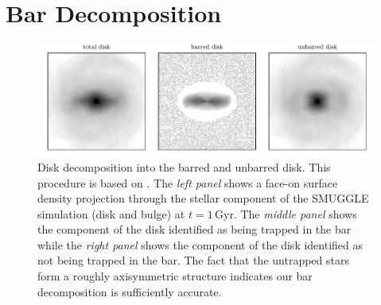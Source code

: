 \documentclass[fleqn,usenatbib]{mnras}
\newcommand{\SMUGGLE}{SMUGGLE}
\begin{document}
\section{Bar Decomposition}
\label{app:bardecomp}
\begin{figure}
    \centering
    \includegraphics[width=18cm]{fig/bar_decomp.pdf}
    \caption{Disk decomposition into the barred and unbarred disk. This
    procedure is based on \citet{2016MNRAS.463.1952P}. The \textit{left panel}
    shows a face-on surface density projection through the stellar component of
    the \SMUGGLE{} simulation (disk and bulge) at $t=1\,\textrm{Gyr}$. The
    \textit{middle panel} shows the component of the disk identified as being
    trapped in the bar while the \textit{right panel} shows the component of the
    disk identified as not being trapped in the bar. The fact that the untrapped
    stars form a roughly axisymmetric structure indicates our bar decomposition
    is sufficiently accurate.}
    \label{fig:decomp}
\end{figure}
\end{document}
